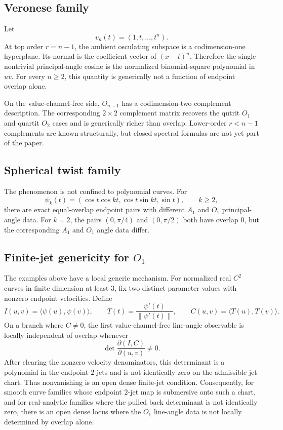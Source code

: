 \documentclass[11pt]{amsart}
\begin{document}
\subsection{Veronese family}

Let
\[
        v_n(t)=(1,t,\ldots,t^n).
\]
At top order \(r=n-1\), the ambient osculating subspace is a codimension-one
hyperplane. Its normal is the coefficient vector of \((x-t)^n\). Therefore the
single nontrivial principal-angle cosine is the normalized binomial-square
polynomial in \(uv\). For every \(n\ge2\), this quantity is generically not a
function of endpoint overlap alone.

On the value-channel-free side, \(O_{n-1}\) has a codimension-two complement
description. The corresponding \(2\times2\) complement matrix recovers the
qutrit \(O_1\) and quartit \(O_2\) cases and is generically richer than overlap.
Lower-order \(r<n-1\) complements are known structurally, but closed spectral
formulas are not yet part of the paper.

\subsection{Spherical twist family}

The phenomenon is not confined to polynomial curves. For
\[
        \psi_k(t)=(\cos t\cos kt,\cos t\sin kt,\sin t),
        \qquad k\ge2,
\]
there are exact equal-overlap endpoint pairs with different \(A_1\) and \(O_1\)
principal-angle data. For \(k=2\), the pairs \((0,\pi/4)\) and \((0,\pi/2)\)
both have overlap \(0\), but the corresponding \(A_1\) and \(O_1\) angle data
differ.

\subsection{\texorpdfstring{Finite-jet genericity for \(O_1\)}{Finite-jet genericity for O1}}

The examples above have a local generic mechanism. For normalized real \(C^2\)
curves in finite dimension at least \(3\), fix two distinct parameter values
with nonzero endpoint velocities. Define
\[
        I(u,v)=\langle\psi(u),\psi(v)\rangle,\qquad
        T(t)=\frac{\psi'(t)}{\|\psi'(t)\|},\qquad
        C(u,v)=\langle T(u),T(v)\rangle .
\]
On a branch where \(C\ne0\), the first value-channel-free line-angle observable
is locally independent of overlap whenever
\[
        \det\frac{\partial(I,C)}{\partial(u,v)}\ne0.
\]
After clearing the nonzero velocity denominators, this determinant is a
polynomial in the endpoint \(2\)-jets and is not identically zero on the
admissible jet chart. Thus nonvanishing is an open dense finite-jet condition.
Consequently, for smooth curve families whose endpoint \(2\)-jet map is
submersive onto such a chart, and for real-analytic families where the pulled
back determinant is not identically zero, there is an open dense locus where the
\(O_1\) line-angle data is not locally determined by overlap alone.
\end{document}
